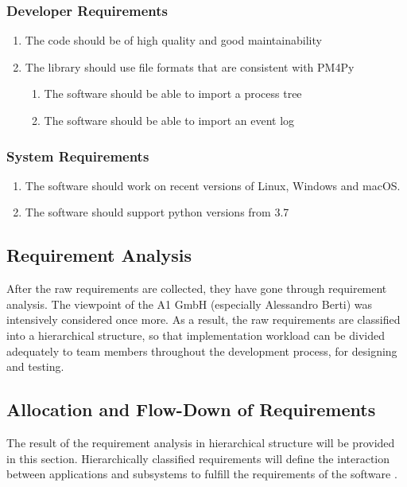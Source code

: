 \documentclass{article}
\begin{document}
\subsubsection{Developer Requirements}
\begin{enumerate}
    \item The code should be of high quality and good maintainability
    \item The library should use file formats that are consistent with PM4Py
    \begin{enumerate}
        \item The software should be able to import a process tree
        \item The software should be able to import an event log
    \end{enumerate}
\end{enumerate}

\subsubsection{System Requirements}
\begin{enumerate}
  \item The software should work on recent versions of Linux, Windows and \mbox{macOS}.
  \item The software should support python versions from 3.7
\end{enumerate}

\subsection{Requirement Analysis}
After the raw requirements are collected, they have gone through requirement analysis. The viewpoint of the A1 GmbH (especially Alessandro Berti) was intensively considered once more. As a result, the raw requirements are classified into a hierarchical structure, so that implementation workload can be divided adequately to team members throughout the development process, for designing and testing.

\subsection{Allocation and Flow-Down of Requirements}
The result of the requirement analysis in hierarchical structure will be provided in this section. Hierarchically classified requirements will define the interaction between applications and subsystems to fulfill the requirements of the software \cite{inproceedings}.
\end{document}
